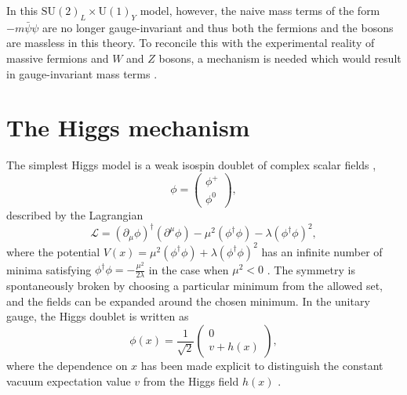 In this $\text{SU}(2)_L \times \text{U}(1)_Y$ model, however, the naive mass terms of the form $-m\bar\psi\psi$
are no longer gauge-invariant and thus both the fermions and the bosons are massless in this theory.
To reconcile this with the experimental reality of massive fermions and $W$ and $Z$ bosons, a
mechanism is needed which would result in gauge-invariant mass terms \cite{Thomson:2013zua}.

\section{The Higgs mechanism}

The simplest Higgs model is a weak isospin doublet of complex scalar fields \cite{Thomson:2013zua},
\begin{equation}
\phi = \begin{pmatrix} \phi^+ \\ \phi^0 \end{pmatrix},
\end{equation}
described by the Lagrangian
\begin{equation}
\mathcal{L} = (\partial_\mu \phi)^\dag (\partial^\mu \phi) - \mu^2(\phi^\dag\phi) - \lambda(\phi^\dag \phi)^2,
\label{eq:higgs_lag}
\end{equation}
where the potential $V(x) = \mu^2(\phi^\dag\phi) + \lambda(\phi^\dag \phi)^2$
has an infinite number of minima satisfying $\phi^\dag \phi = -\frac{\mu^2}{2\lambda}$
in the case when $\mu^2 < 0$ \cite{Thomson:2013zua}. The symmetry is spontaneously broken by choosing a
particular minimum from the allowed set, and the fields can be expanded around the chosen minimum.
In the unitary gauge, the Higgs doublet is written as
\begin{equation}
\phi(x) = \frac{1}{\sqrt{2}} \begin{pmatrix} 0 \\ v + h(x) \end{pmatrix},
\end{equation}
where the dependence on $x$ has been made explicit to distinguish the constant
vacuum expectation value $v$ from the Higgs field $h(x)$ \cite{Thomson:2013zua}.

